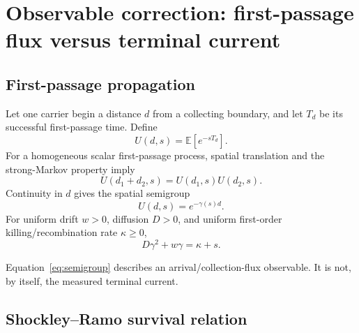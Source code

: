 \documentclass[11pt]{article}
\newcommand{\E}{\mathbb{E}}
\begin{document}
\section{Observable correction: first-passage flux versus terminal current}

\subsection{First-passage propagation}

Let one carrier begin a distance $d$ from a collecting boundary, and let $T_d$ be its successful first-passage time. Define
\begin{equation}
U(d,s)=\E[e^{-sT_d}].
\label{eq:Udef}
\end{equation}
For a homogeneous scalar first-passage process, spatial translation and the strong-Markov property imply
\begin{equation}
U(d_1+d_2,s)=U(d_1,s)U(d_2,s).
\end{equation}
Continuity in $d$ gives the spatial semigroup
\begin{equation}
\boxed{U(d,s)=e^{-\gamma(s)d}.}
\label{eq:semigroup}
\end{equation}
For uniform drift $w>0$, diffusion $D>0$, and uniform first-order killing/recombination rate $\kappa\ge 0$,
\begin{equation}
\boxed{D\gamma^2+w\gamma=\kappa+s.}
\label{eq:dispersion}
\end{equation}

Equation~\eqref{eq:semigroup} describes an arrival/collection-flux observable. It is not, by itself, the measured terminal current.

\subsection{Shockley--Ramo survival relation}
\end{document}
